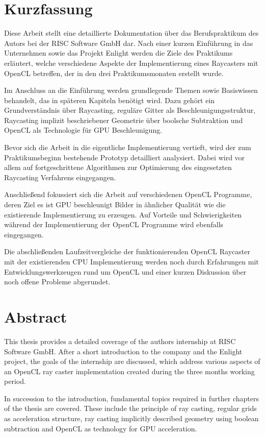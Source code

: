 \chapter*{Kurzfassung}

Diese Arbeit stellt eine detaillierte Dokumentation über das Berufspraktikum des Autors bei der RISC Software GmbH dar. Nach einer kurzen Einführung in das Unternehmen sowie das Projekt Enlight werden die Ziele des Praktikums erläutert, welche verschiedene Aspekte der Implementierung eines Raycasters mit OpenCL betreffen, der in den drei Praktikumsmonaten erstellt wurde.

Im Anschluss an die Einführung werden grundlegende Themen sowie Basiswissen behandelt, das in späteren Kapiteln benötigt wird. Dazu gehört ein Grundverständnis über Raycasting, reguläre Gitter als Beschleunigungsstruktur, Raycasting implizit beschriebener Geometrie über boolsche Subtraktion und OpenCL als Technologie für GPU Beschleunigung.

Bevor sich die Arbeit in die eigentliche Implementierung vertieft, wird der zum Praktikumsbeginn bestehende Prototyp detailliert analysiert. Dabei wird vor allem auf fortgeschrittene Algorithmen zur Optimierung des eingesetzten Raycasting Verfahrens eingegangen.

Anschließend fokussiert sich die Arbeit auf verschiedenen OpenCL Programme, deren Ziel es ist GPU beschleunigt Bilder in ähnlicher Qualität wie die existierende Implementierung zu erzeugen. Auf Vorteile und Schwierigkeiten während der Implementierung der OpenCL Programme wird ebenfalls eingegangen.

Die abschließenden Laufzeitvergleiche der funktionierenden OpenCL Raycaster mit der existierenden CPU Implementierung werden noch durch Erfahrungen mit Entwicklungswerkzeugen rund um OpenCL und einer kurzen Diskussion über noch offene Probleme abgerundet.

\pagebreak

\chapter*{Abstract}

This thesis provides a detailed coverage of the authors internship at RISC Software GmbH. After a short introduction to the company and the Enlight project, the goals of the internship are discussed, which address various aspects of an OpenCL ray caster implementation created during the three months working period.

In succession to the introduction, fundamental topics required in further chapters of the thesis are covered. These include the principle of ray casting, regular grids as acceleration structure, ray casting implicitly described geometry using boolean subtraction and OpenCL as technology for GPU acceleration.

